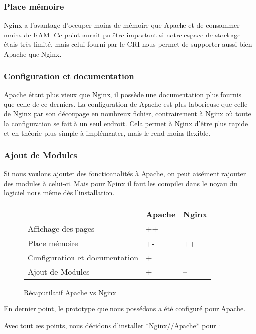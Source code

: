 \subsubsection{Place mémoire}
Nginx a l'avantage d'occuper moins de mémoire que Apache et de consommer moins de RAM.
Ce point aurait pu être important si notre espace de stockage étais très limité, mais celui fourni par le CRI nous permet de supporter aussi bien Apache que Nginx.

\subsubsection{Configuration et documentation}
Apache étant plus vieux que Nginx, il possède une documentation plus fournis que celle de ce derniers.
La configuration de Apache est plus laborieuse que celle de Nginx par son découpage en nombreux fichier, contrairement à Nginx où toute la configuration se fait à un seul endroit.
Cela permet à Nginx d'être plus rapide et en théorie plus simple à implémenter, mais le rend moins flexible.

\subsubsection{Ajout de Modules}
Si nous voulons ajouter des fonctionnalités à Apache, on peut aisément rajouter des modules à celui-ci. Mais pour Nginx il faut les compiler dans le noyau du logiciel nous même dès l'installation.

\begin{figure}[H]
\begin{center}
\begin{tabular}{|m{175pt}|m{50pt}|m{50pt}|}
	\hline
	\null & \textbf{Apache} & \textbf{Nginx} \\
	\hline
	Affichage des pages & ++ & -\\
	\hline
	Place mémoire & +- & ++\\
	\hline
	Configuration et documentation & + & - \\
	\hline
	Ajout de Modules & + & -- \\
	\hline
\end{tabular} \vspace*{5mm}
\caption{Récaputilatif Apache vs Nginx}
\end{center}
\end{figure}

En dernier point, le prototype que nous possédons a été configuré pour Apache.

Avec tout ces points, nous décidons d'installer *Nginx//Apache* pour :


